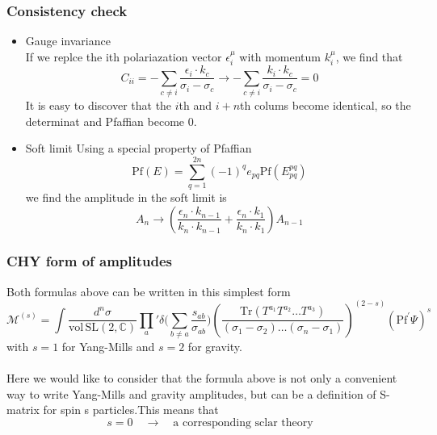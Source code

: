 \documentclass{beamer}
\begin{document}
\begin{frame}
    \frametitle{Consistency check}
    \begin{itemize}
        \item \alert{Gauge invariance}\\
        If we replce the ith polariazation vector $\epsilon_i^\mu$ with momentum $k_i^\mu$, we find that
        \begin{equation*}
            C_{ii}=-\sum_{c\neq i}\frac{\epsilon_i\cdot k_c}{\sigma_i-\sigma_c} \to -\sum_{c\neq i}\frac{k_i\cdot k_c}{\sigma_i-\sigma_c}=0
        \end{equation*}
        It is easy to discover that the $i$th and $i+n$th colums become identical, so the determinat and Pfaffian become 0.
        \pause
        \item \alert{Soft limit}
        Using a special property of Pfaffian
        \begin{equation*}
            \mathrm{Pf} (E)=\sum_{q=1}^{2n}(-1)^q e_{pq}\mathrm{Pf}(E^{pq}_{pq})
        \end{equation*}
        we find the amplitude in the soft limit is 
        \begin{equation*}
            A_n\to\left(\frac{\epsilon_n\cdot k_{n-1}}{k_n\cdot k_{n-1}}+\frac{\epsilon_n\cdot k_1}{k_n\cdot k_1}\right)A_{n-1}
        \end{equation*}
    \end{itemize}
\end{frame}
\begin{frame}
    \frametitle{CHY form of amplitudes}
    Both formulas above can be written in this simplest form 
    \alert{
        \begin{equation*}
            \!\!\!\!\mathcal{M}^{(s)}\!=\!\!\!\int\frac{d^n\sigma}{\mathrm{vol\,SL}(2,\mathbb{C})}\prod_a{'}\delta\bigg(\sum_{b\neq a}\frac{s_{ab}}{\sigma_{ab}}\bigg)
            \!\!\!\left(\frac{\mathrm{Tr}(T^{a_1}T^{a_2}\dots T^{a_3})}{(\sigma_1-\sigma_2)\dots (\sigma_n-\sigma_1)}\right)^{(2-s)}{(\mathrm{Pf}^\prime\Psi)}^s
        \end{equation*}}
    with $s=1$ for Yang-Mills and $s=2$ for gravity.
    \\ \hspace*{\fill}\\
    Here we would like to consider that the formula above is not only a convenient way to write Yang-Mills and gravity amplitudes, but can be \alert{a definition of S-matrix
    for spin s particles}.This means that 
    \begin{equation*}
        s=0\quad\to \quad \text{a corresponding sclar theory}
    \end{equation*}
\end{frame}
\end{document}
